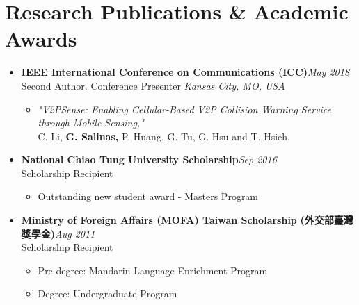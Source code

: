 \section{\sectionheading Research Publications \& Academic Awards}

\begin{itemize}[leftmargin=0pt, label={}]%

\item{
{\sectionheading\large{\textbf{IEEE International Conference on Communications (ICC)}}}\hfill {\sectionheading\small{\textit{May 2018}}}\\
{\sectionheading\small{Second Author. Conference Presenter}}\hfill
{\sectionheading\small{\textit{Kansas City, MO, USA}}}

    \vspace{-6pt}
    \begin{itemize}[label=\textbullet, leftmargin=*, noitemsep]
        \item{
        \textit{"V2PSense: Enabling Cellular-Based V2P Collision Warning Service through Mobile Sensing,"}\\
        C. Li, \textbf{G. Salinas,} P. Huang, G. Tu, G. Hsu and T. Hsieh.
        }
    \end{itemize}
}

\item{
{\sectionheading\large{\textbf{National Chiao Tung University Scholarship}}}\hfill {\sectionheading\small{\textit{Sep 2016}}}\\
{\sectionheading\small{Scholarship Recipient}}\hfill

    \vspace{-6pt}
    \begin{itemize}[label=\textbullet, leftmargin=*, noitemsep]%
        \item{Outstanding new student award - Masters Program}
    \end{itemize}
}

\item{
        {\sectionheading\large{\textbf{Ministry of Foreign Affairs (MOFA) Taiwan Scholarship}}} \textbf{(外交部臺灣獎學金)}\hfill {\sectionheading\small{\textit{Aug 2011}}}\\
{\sectionheading\small{Scholarship Recipient}}\hfill

    \vspace{-6pt}
    \begin{itemize}[label=\textbullet, leftmargin=*, noitemsep]%
        \item{Pre-degree: Mandarin Language Enrichment Program}
        \item{Degree: Undergraduate Program}
    \end{itemize}
}
\end{itemize}

